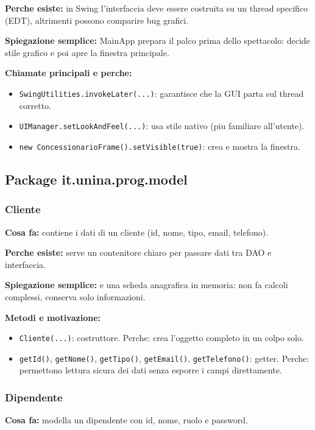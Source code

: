 \documentclass[12pt,a4paper]{article}
\begin{document}
\textbf{Perche esiste:}
in Swing l'interfaccia deve essere costruita su un thread specifico (EDT), altrimenti possono comparire bug grafici.

\textbf{Spiegazione semplice:}
MainApp prepara il palco prima dello spettacolo: decide stile grafico e poi apre la finestra principale.

\textbf{Chiamate principali e perche:}
\begin{itemize}
  \item \texttt{SwingUtilities.invokeLater(...)}: garantisce che la GUI parta sul thread corretto.
  \item \texttt{UIManager.setLookAndFeel(...)}: usa stile nativo (piu familiare all'utente).
  \item \texttt{new ConcessionarioFrame().setVisible(true)}: crea e mostra la finestra.
\end{itemize}

\subsection{Package it.unina.prog.model}

\subsubsection*{Cliente}
\textbf{Cosa fa:}
contiene i dati di un cliente (id, nome, tipo, email, telefono).

\textbf{Perche esiste:}
serve un contenitore chiaro per passare dati tra DAO e interfaccia.

\textbf{Spiegazione semplice:}
e una scheda anagrafica in memoria: non fa calcoli complessi, conserva solo informazioni.

\textbf{Metodi e motivazione:}
\begin{itemize}[leftmargin=1.2cm]
  \item \texttt{Cliente(...)}: costruttore. Perche: crea l'oggetto completo in un colpo solo.
  \item \texttt{getId()}, \texttt{getNome()}, \texttt{getTipo()}, \texttt{getEmail()}, \texttt{getTelefono()}: getter. Perche: permettono lettura sicura dei dati senza esporre i campi direttamente.
\end{itemize}

\subsubsection*{Dipendente}
\textbf{Cosa fa:}
modella un dipendente con id, nome, ruolo e password.
\end{document}
